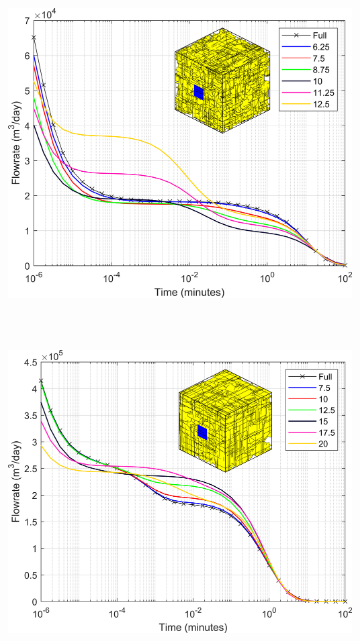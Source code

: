 \documentclass[main.tex]{subfiles}
\begin{document}
\begin{figure}[ht]
\begin{subfigure}{0.3\textwidth}
		\end{subfigure}
		\begin{subfigure}{0.3\textwidth}
			\includegraphics[width=\textwidth]{DD_main/Plot_Drawdown_Case_05_BCinset.png}
			\label{fig:DD_C}
		\end{subfigure}
		\\
		\begin{subfigure}{0.3\textwidth}
			\includegraphics[width=\textwidth]{DD_main/Plot_Drawdown_Case_09_BCinset.png}

\end{subfigure}
\end{figure}
\end{document}
